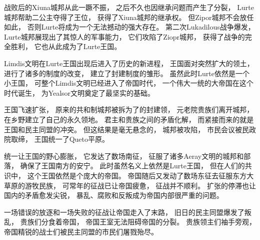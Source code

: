 \documentclass[UTF8,12pt,draft]{ctexbook}
\begin{document}
            战败后的Xiuna城邦从此一蹶不振，
            之后不久也因继承问题而产生了分裂，
            Lurte城邦帮助二公主夺得了王位，
            获得了Xiuna城邦的继承权。
            但Zipor城邦不会放任如此，
            否则Lurte将成为一个无法撼动的强大存在。
            第二次Lukadilous战争爆发，
            Lurte城邦展现出了其惊人的军事能力，
            它们攻陷了Ziopr城邦，
            获得了战争的完全胜利，
            它也从此成为了Lurte王国。

            Limdis文明在Lurte王国出现后进入了历史的新进程，
            王国面对突然扩大的领土，
            进行了诸多的制度的改变，
            建立了封建制度的雏形。
            虽然此时Lurte依然是一个小王国，
            可整个Limdis文明已经进入了帝国时代，
            一个伟大一统的大帝国在这个时代诞生，
            为Yealsor文明奠定了最坚实的基础。

            王国飞速扩张，
            原来的共和制城邦被拆为了的封建领，
            元老院贵族们离开城邦，
            在乡野建立了自己的永久领地。
            君主和贵族之间的矛盾化解，
            而紧接而来的就是王国和民主同盟的冲突。
            但这结果是毫无悬念的，
            城邦被攻陷，
            市民会议被民政院取缔，
            王国统一了Queto平原。

            统一让王国的野心膨胀，
            它发达了数场南征，
            征服了诸多Aeray文明的城邦和部落，
            确保了王国南方的安宁。
            此时虽然名义上依然是Lurte王国，
            但在人们的共识中，
            这个王国依然是个庞大的帝国。
            帝国随后又发动了数场东征去征服东方大草原的游牧民族，
            可常年的征战已让帝国疲惫，
            征战并不顺利。
            扩张的停滞也让国内的矛盾愈发尖锐，
            暴乱、腐败和反叛成为帝国内部很严重的问题。

            一场错误的放逐和一场失败的征战让帝国走入了末路，
            旧日的民主同盟爆发了叛乱，
            贵族们分食着帝国，
            帝国王室无法阻碍帝国的分裂。
            贵族领主们袖手旁观，
            帝国精锐的战士们被民主同盟的市民们屠戮殆尽。



            





\end{document}
